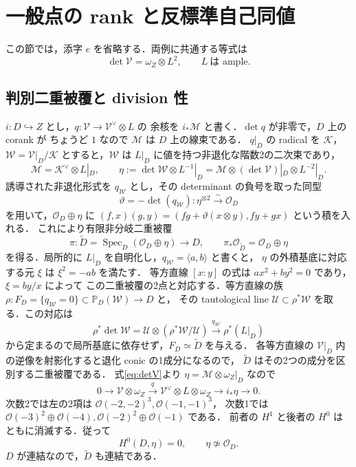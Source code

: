 \section{一般点の rank と反標準自己同値}
\label{sec:serre-rank}

この節では，添字 $e$ を省略する．両例に共通する等式は
\begin{equation}
 \det\mathcal V=\omega_Z\otimes L^2,\qquad L\ \text{は ample}.
 \label{eq:detV}
\end{equation}

\subsection{判別二重被覆と division 性}
\label{subsec:residue}

$i:D\hookrightarrow Z$ とし，$q:\mathcal V\to\mathcal V^\vee\otimes L$ の
余核を $i_*\mathcal M$ と書く．$\det q$ が非零で，$D$ 上の corank が
ちょうど $1$ なので $\mathcal M$ は $D$ 上の線束である．
$q|_D$ の radical を $\mathcal K$，
$\mathcal W=\mathcal V|_D/\mathcal K$ とすると，$\mathcal W$ は
$L|_D$ に値を持つ非退化な階数2の二次束であり，
\[
 \mathcal M=\mathcal K^\vee\otimes L|_D,\qquad
 \eta:=\det\mathcal W\otimes L^{-1}|_D
 =\mathcal M\otimes(\det\mathcal V)|_D\otimes L^{-2}|_D.
\]
誘導された非退化形式を $q_{\mathcal W}$ とし，その determinant の負号を取った同型
\[
 \vartheta=-\det(q_{\mathcal W}):\eta^{\otimes2}\xrightarrow{\sim}\mathcal O_D
\]
を用いて，$\mathcal O_D\oplus\eta$ に
$(f,x)(g,y)=(fg+\vartheta(x\otimes y),fy+gx)$ という積を入れる．
これにより有限非分岐二重被覆
\[
 \pi:\widetilde D=\operatorname{Spec}_D(\mathcal O_D\oplus\eta)\longrightarrow D,
 \qquad
 \pi_*\mathcal O_{\widetilde D}=\mathcal O_D\oplus\eta
\]
を得る．局所的に $L|_D$ を自明化し，$q_{\mathcal W}=\langle a,b\rangle$ と書くと，
$\eta$ の外積基底に対応する元 $\xi$ は $\xi^2=-ab$ を満たす．
等方直線 $[x:y]$ の式は $ax^2+by^2=0$ であり，$\xi=by/x$ によって
この二重被覆の2点と対応する．等方直線の族
$\rho:F_D=\{q_{\mathcal W}=0\}\subset\mathbb P_D(\mathcal W)\to D$ と，
その tautological line $\mathcal U\subset\rho^*\mathcal W$ を取る．この対応は
\[
 \rho^*\det\mathcal W=\mathcal U\otimes(\rho^*\mathcal W/\mathcal U)
 \xrightarrow{q_{\mathcal W}}\rho^*(L|_D)
\]
から定まるので局所基底に依存せず，$F_D\simeq\widetilde D$ を与える．
各等方直線の $\mathcal V|_D$ 内の逆像を射影化すると退化 conic の1成分になるので，
$\widetilde D$ はその2つの成分を区別する二重被覆である．
式\eqref{eq:detV}より $\eta=\mathcal M\otimes\omega_Z|_D$ なので
\begin{equation}
 0\longrightarrow \mathcal V\otimes\omega_Z
 \xrightarrow{q} \mathcal V^\vee\otimes L\otimes\omega_Z
 \longrightarrow i_*\eta\longrightarrow0 .
 \label{eq:eta-resolution}
\end{equation}
次数2では左の2項は
$\mathcal O(-2,-2)^3,\mathcal O(-1,-1)^3$，
次数1では
$\mathcal O(-3)^2\oplus\mathcal O(-4),
\mathcal O(-2)^2\oplus\mathcal O(-1)$ である．
前者の $H^1$ と後者の $H^0$ はともに消滅する．従って
\begin{equation}
 H^0(D,\eta)=0,\qquad \eta\not\simeq\mathcal O_D.
 \label{eq:eta-nontrivial}
\end{equation}
$D$ が連結なので，$\widetilde D$ も連結である．

